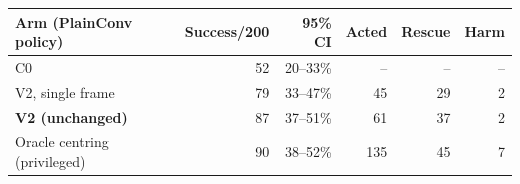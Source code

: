 \begin{tabular}{lrrrrr}
\toprule
Arm (PlainConv policy) & Success/200 & 95\% CI & Acted & Rescue & Harm\\
\midrule
C0 & 52 & 20--33\% & -- & -- & --\\
V2, single frame & 79 & 33--47\% & 45 & 29 & 2\\
\textbf{V2 (unchanged)} & 87 & 37--51\% & 61 & 37 & 2\\
Oracle centring (privileged) & 90 & 38--52\% & 135 & 45 & 7\\
\bottomrule
\end{tabular}

